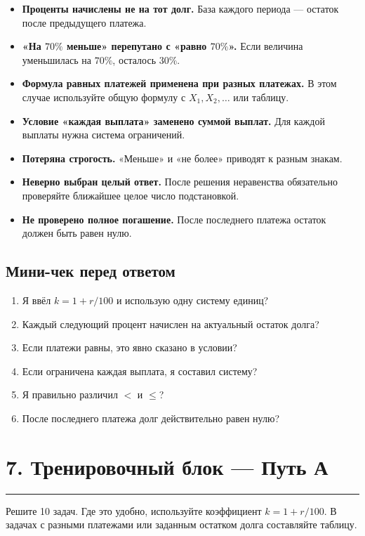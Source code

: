 \documentclass[a4paper,12pt]{article}
\newcommand{\sectionline}{\vspace{-0.4em}\textcolor{linegray}{\rule{\linewidth}{0.5pt}}\vspace{0.35em}}
\newcommand{\key}[1]{\textcolor{darkaccent}{\textbf{#1}}}
\begin{document}
\begin{itemize}
\item \key{Проценты начислены не на тот долг.} База каждого периода --- остаток после предыдущего платежа.
\item \key{«На $70\%$ меньше» перепутано с «равно $70\%$».} Если величина уменьшилась на $70\%$, осталось $30\%$.
\item \key{Формула равных платежей применена при разных платежах.} В этом случае используйте общую формулу с $X_1,X_2,\ldots$ или таблицу.
\item \key{Условие «каждая выплата» заменено суммой выплат.} Для каждой выплаты нужна система ограничений.
\item \key{Потеряна строгость.} «Меньше» и «не более» приводят к разным знакам.
\item \key{Неверно выбран целый ответ.} После решения неравенства обязательно проверяйте ближайшее целое число подстановкой.
\item \key{Не проверено полное погашение.} После последнего платежа остаток должен быть равен нулю.
\end{itemize}

\subsection*{Мини-чек перед ответом}
\begin{enumerate}
\item Я ввёл $k=1+r/100$ и использую одну систему единиц?
\item Каждый следующий процент начислен на актуальный остаток долга?
\item Если платежи равны, это явно сказано в условии?
\item Если ограничена каждая выплата, я составил систему?
\item Я правильно различил $<$ и $\le$?
\item После последнего платежа долг действительно равен нулю?
\end{enumerate}

\clearpage

\section*{7. Тренировочный блок --- Путь А}
\sectionline

Решите 10 задач. Где это удобно, используйте коэффициент $k=1+r/100$. В задачах с разными платежами или заданным остатком долга составляйте таблицу.
\end{document}
